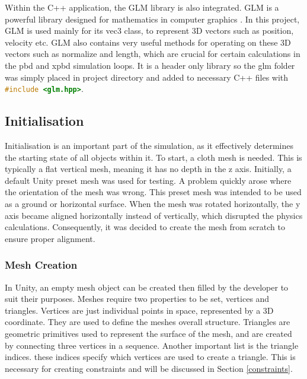 \documentclass[12pt,a4paper]{article}
\begin{document}
Within the C++ application, the GLM library is also integrated. GLM is a powerful library designed for mathematics in computer graphics \cite{glm}. In this project, GLM is used mainly for its vec3 class, to represent 3D vectors such as position, velocity etc. GLM also contains very useful methods for operating on these 3D vectors such as normalize and length, which are crucial for certain calculations in the pbd and xpbd simulation loops. It is a header only library so the glm folder was simply placed in project directory and added to necessary C++ files with \lstinline[language=C++]!#include <glm.hpp>!.
\subsection{Initialisation}
Initialisation is an important part of the simulation, as it effectively determines the starting state of all objects within it. To start, a cloth mesh is needed. This is typically a flat vertical mesh, meaning it has no depth in the z axis. Initially, a default Unity preset mesh was used for testing. A problem quickly arose where the orientation of the mesh was wrong. This preset mesh was intended to be used as a ground or horizontal surface. When the mesh was rotated horizontally, the y axis became aligned horizontally instead of vertically, which disrupted the physics calculations. Consequently, it was decided to create the mesh from scratch to ensure proper alignment.

\subsubsection{Mesh Creation}
\label{creation}
In Unity, an empty mesh object can be created then filled by the developer to suit their purposes. Meshes require two properties to be set, vertices and triangles. Vertices are just individual points in space, represented by a 3D coordinate. They are used to define the meshes overall structure. Triangles are geometric primitives used to represent the surface of the mesh, and are created by connecting three vertices in a sequence. Another important list is the triangle indices. these indices specify which vertices are used to create a triangle. This is necessary for creating constraints and will be discussed in Section \ref{constraints}. \\
\end{document}
